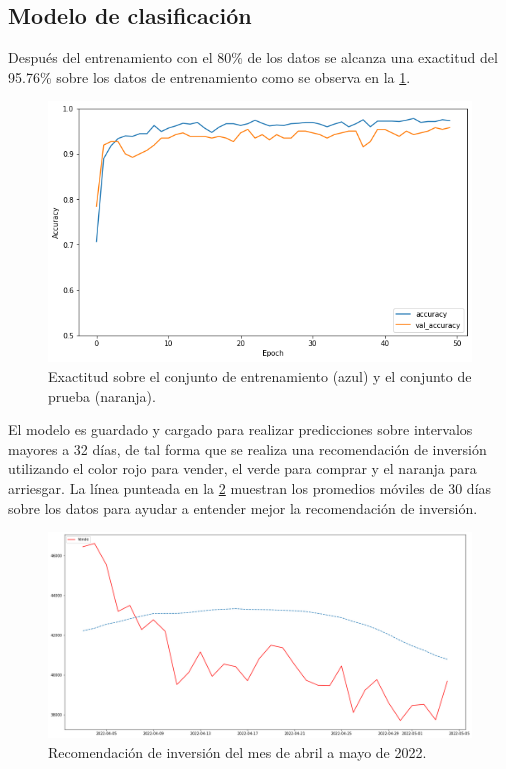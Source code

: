 \subsection{Modelo de clasificación}

Después del entrenamiento con el 80\% de los datos se alcanza una exactitud del 95.76\% sobre los datos de entrenamiento como se observa en la \cref{fig31}.

\begin{figure}[h!]
	\centering
	\includegraphics[scale=0.6]{Chapter5/exactitud_clas.png}
	\caption{Exactitud sobre el conjunto de entrenamiento (azul) y el conjunto de prueba (naranja).}
	\label{fig31}
\end{figure}

El modelo es guardado y cargado para realizar predicciones sobre intervalos mayores a 32 días, de tal forma que se realiza una recomendación de inversión utilizando el color rojo para vender, el verde para comprar y el naranja para arriesgar. La línea punteada en la \cref{fig32} muestran los promedios móviles de 30 días sobre los datos para ayudar a entender mejor la recomendación de inversión. 

\begin{figure}[h!]
	\centering
	\includegraphics[scale=0.4]{Chapter5/reco.png}
	\caption{Recomendación de inversión del mes de abril a mayo de 2022.}
	\label{fig32}
\end{figure}

